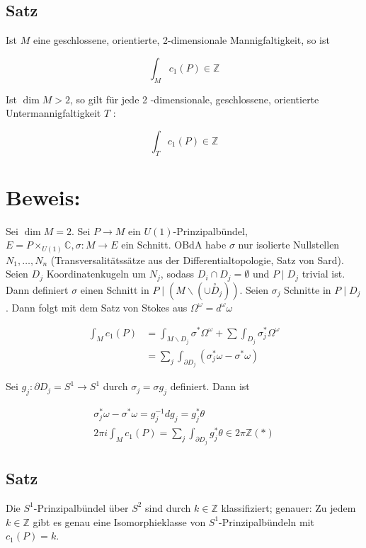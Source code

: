 \documentclass[10pt, letterpaper]{article}
\begin{document}
\subsection*{Satz}
Ist $M$ eine geschlossene, orientierte, 2-dimensionale Mannigfaltigkeit, so ist

$$
\int_{M} c_{1}(P) \in \mathbb{Z}
$$

Ist $\operatorname{dim} M>2$, so gilt für jede 2 -dimensionale, geschlossene, orientierte Untermannigfaltigkeit $T$ :

$$
\int_{T} c_{1}(P) \in \mathbb{Z}
$$

\section*{Beweis:}
Sei $\operatorname{dim} M=2$. Sei $P \rightarrow M$ ein $U(1)$-Prinzipalbündel, $E=P \times_{U(1)} \mathbb{C}, \sigma: M \rightarrow E$ ein Schnitt. OBdA habe $\sigma$ nur isolierte Nullstellen $N_{1}, \ldots, N_{n}$ (Transversalitätssätze aus der Differentialtopologie, Satz von Sard). Seien $D_{j}$ Koordinatenkugeln um $N_{j}$, sodass $D_{i} \cap D_{j}=\emptyset$ und $P \mid D_{j}$ trivial ist. Dann definiert $\sigma$ einen Schnitt in $P \mid\left(M \backslash\left(\cup \stackrel{\circ}{D}_{j}\right)\right)$. Seien $\sigma_{j}$ Schnitte in $P \mid D_{j}$. Dann folgt mit dem Satz von Stokes aus $\Omega^{\omega}=d^{\omega} \omega$

$$
\begin{aligned}
\int_{M} c_{1}(P) & =\int_{M \backslash D_{j}} \sigma^{*} \Omega^{\omega}+\sum \int_{D_{j}} \sigma_{j}^{*} \Omega^{\omega} \\
& =\sum_{j} \int_{\partial D_{j}}\left(\sigma_{j}^{*} \omega-\sigma^{*} \omega\right)
\end{aligned}
$$

Sei $g_{j}: \partial D_{j}=S^{1} \rightarrow S^{1}$ durch $\sigma_{j}=\sigma g_{j}$ definiert. Dann ist

$$
\begin{gathered}
\sigma_{j}^{*} \omega-\sigma^{*} \omega=g_{j}^{-1} d g_{j}=g_{j}^{*} \theta \\
2 \pi i \int_{M} c_{1}(P)=\sum_{j} \int_{\partial D_{j}} g_{j}^{*} \theta \in 2 \pi \mathbb{Z}(*)
\end{gathered}
$$

\subsection*{Satz}
Die $S^{1}$-Prinzipalbündel über $S^{2}$ sind durch $k \in \mathbb{Z}$ klassifiziert; genauer: Zu jedem $k \in \mathbb{Z}$ gibt es genau eine Isomorphieklasse von $S^{1}$-Prinzipalbündeln mit $c_{1}(P)=k$.
\end{document}
